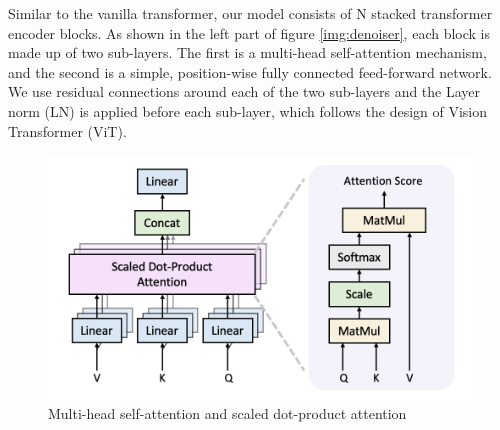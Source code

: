 \documentclass[12pt,DIV14,BCOR12mm,a4paper,footinclude=false,headinclude,parskip=half-,twoside,openright,cleardoublepage=empty,toc=index,bibliography=totoc,listof=totoc]{scrreprt}
\numberwithin{equation}{chapter}
\begin{document}
Similar to the vanilla transformer, our model consists of N stacked transformer encoder blocks. As shown in the left part of figure \ref{img:denoiser}, each block is made up of two sub-layers. The first is a multi-head self-attention mechanism, and the second is a simple, position-wise fully connected feed-forward network. We use residual connections around each of the two sub-layers and the Layer norm (LN) is applied before each sub-layer, which follows the design of Vision Transformer
 (ViT)\cite{dosovitskiy2021image}.
\begin{figure}[h]
	\centering
	\includegraphics[scale=.30]{img/mhsa.png}
	\caption{Multi-head self-attention and scaled dot-product attention}
	\label{img:mhsa}
\end{figure}
\end{document}
